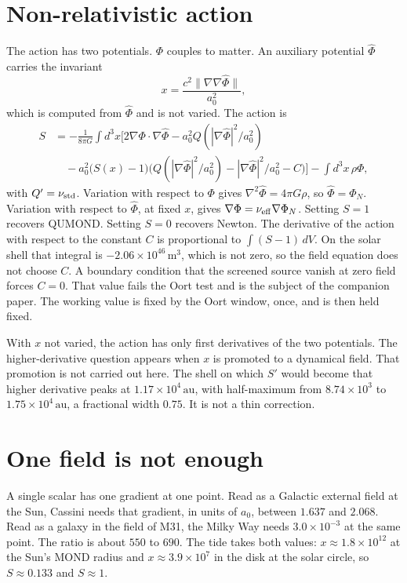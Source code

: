 \section{Non-relativistic action}

The action has two potentials. \(\Phi\) couples to matter. An auxiliary potential \(\hat\Phi\) carries the invariant
\[
x=\frac{c^2\|\nabla\nabla\hat\Phi\|}{a_0^2},
\]
which is computed from \(\hat\Phi\) and is not varied. The action is
\begin{align}
S&=-\frac{1}{8\pi G}\int d^3x\Big[
2\nabla\Phi\cdot\nabla\hat\Phi
-a_0^2 Q(|\nabla\hat\Phi|^2/a_0^2) \nonumber\\
&\quad -a_0^2\bigl(S(x)-1\bigr)\bigl(Q(|\nabla\hat\Phi|^2/a_0^2)-|\nabla\hat\Phi|^2/a_0^2-C\bigr)
\Big]
-\int d^3x\,\rho\Phi,
\label{eq:action}
\end{align}
with \(Q'=\nu_{\rm std}\). Variation with respect to \(\Phi\) gives \(\nabla^2\hat\Phi=4\pi G\rho\), so \(\hat\Phi=\Phi_N\). Variation with respect to \(\hat\Phi\), at fixed \(x\), gives \(\nabla\Phi=\nu_{\rm eff}\nabla\Phi_N\). Setting \(S=1\) recovers QUMOND. Setting \(S=0\) recovers Newton. The derivative of the action with respect to the constant \(C\) is proportional to \(\int(S-1)\,dV\). On the solar shell that integral is \(-2.06\times10^{46}\,\mathrm{m}^3\), which is not zero, so the field equation does not choose \(C\). A boundary condition that the screened source vanish at zero field forces \(C=0\). That value fails the Oort test and is the subject of the companion paper. The working value is fixed by the Oort window, once, and is then held fixed.

With \(x\) not varied, the action has only first derivatives of the two potentials. The higher-derivative question appears when \(x\) is promoted to a dynamical field. That promotion is not carried out here. The shell on which \(S'\) would become that higher derivative peaks at \(1.17\times10^{4}\,\mathrm{au}\), with half-maximum from \(8.74\times10^{3}\) to \(1.75\times10^{4}\,\mathrm{au}\), a fractional width \(0.75\). It is not a thin correction.

\section{One field is not enough}

A single scalar has one gradient at one point. Read as a Galactic external field at the Sun, Cassini needs that gradient, in units of \(a_0\), between \(1.637\) and \(2.068\). Read as a galaxy in the field of M31, the Milky Way needs \(3.0\times10^{-3}\) at the same point. The ratio is about \(550\) to \(690\). The tide takes both values: \(x\approx1.8\times10^{12}\) at the Sun's MOND radius and \(x\approx3.9\times10^{7}\) in the disk at the solar circle, so \(S\approx0.133\) and \(S\approx1\).

